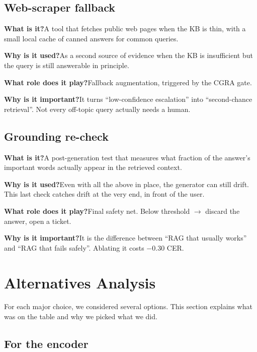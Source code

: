 \documentclass[11pt,a4paper]{article}
\begin{document}
\subsection{Web-scraper fallback}

\textbf{What is it?}\quad A tool that fetches public web pages when the KB is thin, with a small local cache of canned answers for common queries.

\textbf{Why is it used?}\quad As a second source of evidence when the KB is insufficient but the query is still answerable in principle.

\textbf{What role does it play?}\quad Fallback augmentation, triggered by the CGRA gate.

\textbf{Why is it important?}\quad It turns ``low-confidence escalation'' into ``second-chance retrieval''. Not every off-topic query actually needs a human.

\subsection{Grounding re-check}

\textbf{What is it?}\quad A post-generation test that measures what fraction of the answer's important words actually appear in the retrieved context.

\textbf{Why is it used?}\quad Even with all the above in place, the generator can still drift. This last check catches drift at the very end, in front of the user.

\textbf{What role does it play?}\quad Final safety net. Below threshold $\rightarrow$ discard the answer, open a ticket.

\textbf{Why is it important?}\quad It is the difference between ``RAG that usually works'' and ``RAG that fails safely''. Ablating it costs $-0.30$ CER.

\clearpage
\section{Alternatives Analysis}
\label{sec:alternatives}

For each major choice, we considered several options. This section explains what was on the table and why we picked what we did.

\subsection{For the encoder}
\end{document}
